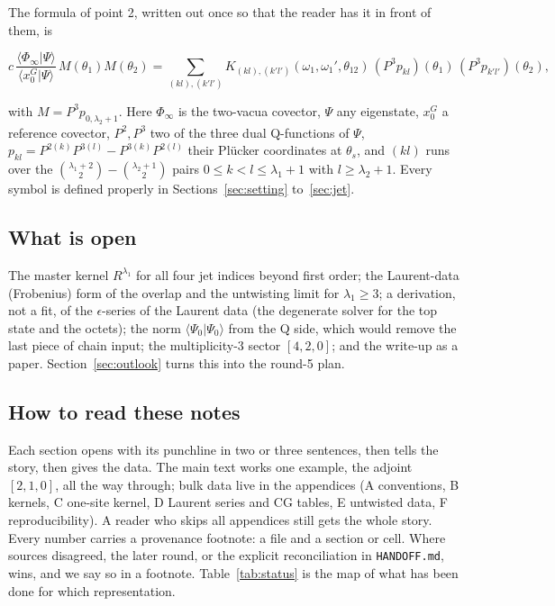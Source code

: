 \documentclass[11pt]{article}
\begin{document}
The formula of point 2, written out once so that the reader has it in front of them, is

\begin{equation}
c\,\frac{\langle\Phi_\infty|\Psi\rangle}{\langle x_0^G|\Psi\rangle}\,M(\theta_1)M(\theta_2)=\sum_{(kl),(k'l')}K_{(kl),(k'l')}(\omega_1,\omega_1',\theta_{12})\,(P^3p_{kl})(\theta_1)\,(P^3p_{k'l'})(\theta_2),\label{eq:jet0}
\end{equation}

with $M=P^3p_{0,\lambda_2+1}$. Here $\Phi_\infty$ is the two-vacua covector, $\Psi$ any eigenstate, $x_0^G$ a reference covector, $P^2,P^3$ two of the three dual Q-functions of $\Psi$, $p_{kl}=P^{2(k)}P^{3(l)}-P^{3(k)}P^{2(l)}$ their Plücker coordinates at $\theta_s$, and $(kl)$ runs over the $\binom{\lambda_1+2}{2}-\binom{\lambda_2+1}{2}$ pairs $0\le k<l\le\lambda_1+1$ with $l\ge\lambda_2+1$. Every symbol is defined properly in Sections~\ref{sec:setting} to~\ref{sec:jet}.

\subsection{What is open}\label{sec:open}

The master kernel $R^{\lambda_1}$ for all four jet indices beyond first order; the Laurent-data (Frobenius) form of the overlap and the untwisting limit for $\lambda_1\ge3$; a derivation, not a fit, of the $\epsilon$-series of the Laurent data (the degenerate solver for the top state and the octets); the norm $\langle\Psi_0|\Psi_0\rangle$ from the Q side, which would remove the last piece of chain input; the multiplicity-3 sector $[4,2,0]$; and the write-up as a paper.
Section~\ref{sec:outlook} turns this into the round-5 plan.

\subsection{How to read these notes}\label{sec:reading}

Each section opens with its punchline in two or three sentences, then tells the story, then gives the data.
The main text works one example, the adjoint $[2,1,0]$, all the way through; bulk data live in the appendices (A conventions, B kernels, C one-site kernel, D Laurent series and CG tables, E untwisted data, F reproducibility).
A reader who skips all appendices still gets the whole story.
Every number carries a provenance footnote: a file and a section or cell.
Where sources disagreed, the later round, or the explicit reconciliation in \texttt{HANDOFF.\allowbreak{}md}, wins, and we say so in a footnote.
Table~\ref{tab:status} is the map of what has been done for which representation.
\end{document}
